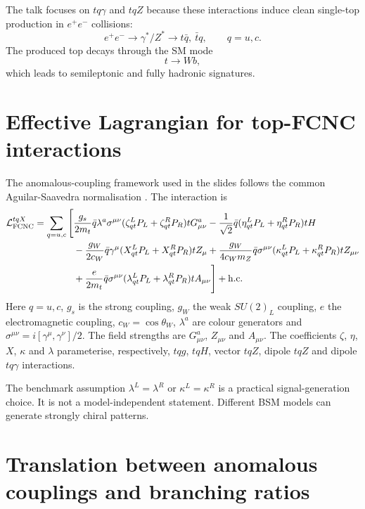 \documentclass[11pt,a4paper]{report}
\newcommand{\ee}{e^+e^-}
\begin{document}
The talk focuses on $tq\gamma$ and $tqZ$ because these interactions induce clean single-top production in $\ee$ collisions:
\begin{equation}
  \ee\to \gamma^*/Z^*\to t\bar q,\ \bar t q,
  \qquad q=u,c.
\end{equation}
The produced top decays through the SM mode
\begin{equation}
  t\to Wb,
\end{equation}
which leads to semileptonic and fully hadronic signatures.

\section{Effective Lagrangian for top-FCNC interactions}

The anomalous-coupling framework used in the slides follows the common Aguilar-Saavedra normalisation \cite{AguilarSaavedra2009}.  The interaction is
\begin{align}
\mathcal L_{\rm FCNC}^{tqX}=\sum_{q=u,c}\Bigg[&
\frac{g_s}{2m_t}\bar q\lambda^a\sigma^{\mu\nu}(\zeta^L_{qt}P_L+\zeta^R_{qt}P_R)tG^a_{\mu\nu}
-\frac{1}{\sqrt2}\bar q(\eta^L_{qt}P_L+\eta^R_{qt}P_R)tH \\
&-\frac{g_W}{2c_W}\bar q\gamma^\mu(X^L_{qt}P_L+X^R_{qt}P_R)tZ_\mu
+\frac{g_W}{4c_Wm_Z}\bar q\sigma^{\mu\nu}(\kappa^L_{qt}P_L+\kappa^R_{qt}P_R)tZ_{\mu\nu}\\
&+\frac{e}{2m_t}\bar q\sigma^{\mu\nu}(\lambda^L_{qt}P_L+\lambda^R_{qt}P_R)tA_{\mu\nu}
\Bigg]+{\rm h.c.}
\label{eq:fcncLag}
\end{align}
Here $q=u,c$, $g_s$ is the strong coupling, $g_W$ the weak $SU(2)_L$ coupling, $e$ the electromagnetic coupling, $c_W=\cos\theta_W$, $\lambda^a$ are colour generators and $\sigma^{\mu\nu}=i[\gamma^\mu,\gamma^\nu]/2$.  The field strengths are $G^a_{\mu\nu}$, $Z_{\mu\nu}$ and $A_{\mu\nu}$.  The coefficients $\zeta$, $\eta$, $X$, $\kappa$ and $\lambda$ parameterise, respectively, $tqg$, $tqH$, vector $tqZ$, dipole $tqZ$ and dipole $tq\gamma$ interactions.

\begin{warningbox}
The benchmark assumption $\lambda^L=\lambda^R$ or $\kappa^L=\kappa^R$ is a practical signal-generation choice.  It is not a model-independent statement.  Different BSM models can generate strongly chiral patterns.
\end{warningbox}

\section{Translation between anomalous couplings and branching ratios}
\end{document}
